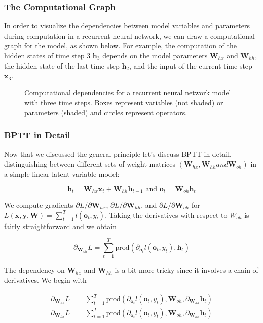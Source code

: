 \subsubsection{The Computational Graph}

In order to visualize the dependencies between model variables and parameters during computation in a recurrent neural network, we can draw a computational graph for the model, as shown below. For example, the computation of the hidden states of time step 3 $\mathbf{h}_3$ depends on the model parameters $\mathbf{W}_{hx}$ and $\mathbf{W}_{hh}$, the hidden state of the last time step $\mathbf{h}_2$, and the input of the current time step $\mathbf{x}_3.$

\begin{figure}[hpt]
	\centering
	
	\caption{Computational dependencies for a recurrent neural network model with three time steps. Boxes represent variables (not shaded) or parameters (shaded) and circles represent operators.}
	\label{fig:rnn-bptt}
\end{figure}

\subsubsection{BPTT in Detail}

Now that we discussed the general principle let’s discuss BPTT in detail, distinguishing between different sets of weight matrices $(\mathbf{W}_{hx}, \mathbf{W}_{hh} and \mathbf{W}_{oh})$ in a simple linear latent variable model:

$$\mathbf{h}_t = \mathbf{W}_{hx} \mathbf{x}_t + \mathbf{W}_{hh} \mathbf{h}_{t-1} \text{ and }\mathbf{o}_t = \mathbf{W}_{oh} \mathbf{h}_t$$

We compute gradients $\partial L/\partial \mathbf{W}_{hx}$, $\partial L/\partial \mathbf{W}_{hh}$, and $\partial L/\partial \mathbf{W}_{oh}$ for $L(\mathbf{x}, \mathbf{y}, \mathbf{W}) = \sum_{t=1}^T l(\mathbf{o}_t, y_t)$. Taking the derivatives with respect to $W_{oh}$ is fairly straightforward and we obtain

$$\partial_{\mathbf{W}_{oh}} L = \sum_{t=1}^T \mathrm{prod}
\left(\partial_{\mathbf{o}_t} l(\mathbf{o}_t, y_t), \mathbf{h}_t\right)$$

The dependency on $\mathbf{W}_{hx}$ and $\mathbf{W}_{hh}$ is a bit more tricky since it involves a chain of derivatives. We begin with

$$
\begin{aligned}
\partial_{\mathbf{W}_{hh}} L & = \sum_{t=1}^T \mathrm{prod}
\left(\partial_{\mathbf{o}_t} l(\mathbf{o}_t, y_t), \mathbf{W}_{oh}, \partial_{\mathbf{W}_{hh}} \mathbf{h}_t\right) \\
\partial_{\mathbf{W}_{hx}} L & = \sum_{t=1}^T \mathrm{prod}
\left(\partial_{\mathbf{o}_t} l(\mathbf{o}_t, y_t), \mathbf{W}_{oh}, \partial_{\mathbf{W}_{hx}} \mathbf{h}_t\right)
\end{aligned}
$$

